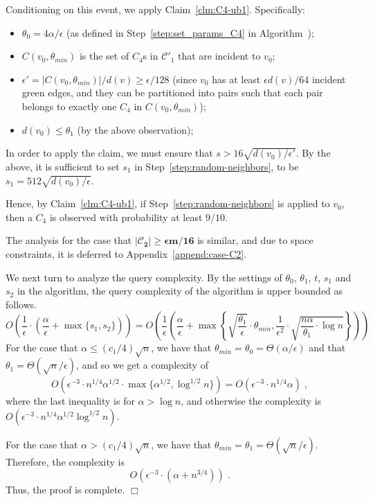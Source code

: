 \documentclass{article}
\newcommand{\eps}{\epsilon}
\newcommand{\calC}{{\mathcal{C}}}
\newenvironment{proofof}[1]{\smallskip\noindent{\bf Proof of #1:}}%
        {\hspace*{\fill}$\Box$\par}
\newcommand{\TestCfour}{\hyperref[alg:C4]{\color{black}{\sf Test-$C_4$-freeness}}}
\begin{document}
\begin{proofof}{Theorem~\ref{thm:C4-ub}}
 Conditioning on this event, we apply Claim~\ref{clm:C4-ub1}. 
 Specifically:
 \begin{itemize}
     \item $\theta_0=4\alpha/\eps$ 
      (as defined in Step~\ref{step:set_params_C4} in Algorithm~\TestCfour); %
     \item $C(v_0,\theta_{min})$ is the set of $C_4$s in $\calC'_1$ that are incident to $v_0$;
     \item $\eps' = |C(v_0,\theta_{min})|/d(v) \geq \eps/128$ (since $v_0$ has at least $\eps d(v)/64$ incident green edges, and they can be partitioned into pairs such that each pair belongs to exactly one $C_4$ in $C(v_0,\theta_{min})$);
     \item $d(v_0) \leq \theta_1$ (by 
     the above observation);
 \end{itemize}
 In order to apply the claim, we must ensure that $s>16\sqrt{d(v_0)/\eps'}$. By the above, it is sufficient to set $s_1$ in Step~\ref{step:random-neighbors}, to be $s_1=512\sqrt{d(v_0)/\eps}$.
 
 Hence, by Claim~\ref{clm:C4-ub1}, if Step~\ref{step:random-neighbors} is applied to $v_0$, then a $C_4$ is observed with probability at least $9/10$.

The analysis for the case that $\mathbf{|\calC_2| \geq \eps m/16}$ is similar, and due to space constraints, it is deferred to Appendix~\ref{append:case-C2}. 

We next turn to analyze the query complexity. By the settings of $\theta_0$, $\theta_1$, $t$, $s_1$ and $s_2$ in the algorithm,
the query complexity of the algorithm is upper bounded as follows.
\begin{equation}
O\left(\frac{1}{\eps}\cdot \left(\frac{\alpha}{\eps}+\max\{s_1, s_2\}\right) \right) =
%
O\left(\frac{1}{\eps}\left( \frac{\alpha}{\eps}+\max\left\{\sqrt{\frac{\theta_1}{\eps}}\cdot \theta_{min}, \frac{1}{\eps^2}\cdot \sqrt{\frac{n\alpha}{\theta_1}\cdot\log n}\right\} \right) \right) 
\end{equation}
For the case that $\alpha\leq(c_1/4)\sqrt n$, we have that $\theta_{min}=\theta_0=\Theta(\alpha/\eps)$ and that $\theta_1=\Theta(\sqrt n/\eps)$, and so we get a complexity of
\begin{equation}
     O\left(
\eps^{-3} \cdot n^{1/4}\alpha^{1/2} \cdot \max\{\alpha^{1/2},\log^{1/2} n\}
 \right) = O(\eps^{-3}\cdot n^{1/4}\alpha)\;,
\end{equation}
where the last inequality is for $\alpha>\log n$, and otherwise the complexity is $O(\eps^{-3}\cdot n^{1/4}\alpha^{1/2}\log^{1/2} n)$. 

For the case that $\alpha>(c_1/4)\sqrt{n}$, we have that $\theta_{min}=\theta_1=\Theta(\sqrt n/\eps)$. Therefore, the complexity is
\begin{equation}
     O(\eps^{-3}\cdot (\alpha+n^{3/4}))\;.
\end{equation}
Thus, the proof is complete.
\end{proofof}
\end{document}
